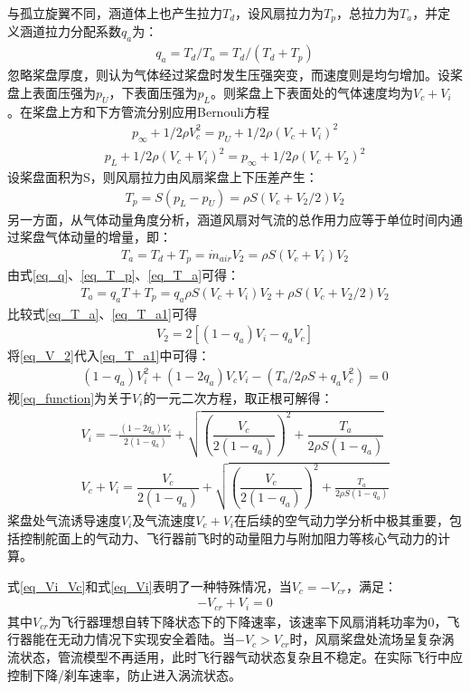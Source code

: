 与孤立旋翼不同，涵道体上也产生拉力$ T_d $，设风扇拉力为$ T_p $，总拉力为$ T_a $，并定义涵道拉力分配系数$ q_a $为：
\begin{align}
q_a=T_d/T_a=T_d/(T_d+T_p )
\end{align}
忽略桨盘厚度，则认为气体经过桨盘时发生压强突变，而速度则是均匀增加。设桨盘上表面压强为$ p_U $，下表面压强为$ p_L $。则桨盘上下表面处的气体速度均为$ V_c+V_i $。在桨盘上方和下方管流分别应用Bernouli方程
\begin{align}
p_\infty+1/2 ρV_c^2=p_U+1/2 ρ(V_c+V_i )^2	\label{eq_q}
\end{align}
\begin{align}
p_L+1/2 ρ(V_c+V_i )^2=p_\infty+1/2 ρ(V_c+V_2 )^2	
\end{align}
设桨盘面积为S，则风扇拉力由风扇桨盘上下压差产生：
\begin{align}
T_p=S(p_L-p_U )=ρS(V_c+V_2/2) V_2	\label{eq_T_p}
\end{align}
另一方面，从气体动量角度分析，涵道风扇对气流的总作用力应等于单位时间内通过桨盘气体动量的增量，即：
\begin{align}
T_a=T_d+T_p=\dot{m}_{air} V_2=ρS(V_c+V_i ) V_2	\label{eq_T_a}
\end{align}
由式\eqref{eq_q}、\eqref{eq_T_p}、\eqref{eq_T_a}可得：
\begin{align}
T_a=q_aT+T_p= q_aρS(V_c+V_i ) V_2+ ρS(V_c+V_2/2) V_2	\label{eq_T_a1}
\end{align}
比较式\eqref{eq_T_a}、\eqref{eq_T_a1}可得
\begin{align}
V_2=2[(1-q_a) V_i-q_aV_c ]	\label{eq_V_2}
\end{align}
将\eqref{eq_V_2}代入\eqref{eq_T_a1}中可得：
\begin{align}
(1-q_a) V_i^2+(1-2q_a) V_c V_i-(T_a/2ρS+q_aV_c^2 )=0	\label{eq_function}
\end{align}
视\eqref{eq_function}为关于$ V_i $的一元二次方程，取正根可解得：
\begin{align}
V_{i}=-\frac{(1-2 q_a) V_{c}}{2(1-q_a)}+\sqrt{\left(\dfrac{V_{c}}{2(1-q_a)}\right)^{2}+\dfrac{T_a}{2 \rho S(1-q_a)}} \label{eq_Vi}	\\
V_{c}+V_{i}=\dfrac{V_{c}}{2(1-q_a)}+\sqrt{\left(\dfrac{V_{c}}{2(1-q_a)}\right)^{2}+\frac{T_a}{2 \rho S(1-q_a)}}	\label{eq_Vi_Vc}
\end{align}
桨盘处气流诱导速度$ V_i $及气流速度$ V_c+V_i $在后续的空气动力学分析中极其重要，包括控制舵面上的气动力、飞行器前飞时的动量阻力与附加阻力等核心气动力的计算。

式\eqref{eq_Vi_Vc}和式\eqref{eq_Vi}表明了一种特殊情况，当$ V_c=-V_{cr} $，满足：
\begin{align}
-V_{cr}+V_i=0
\end{align}
其中$ V_{cr} $为飞行器理想自转下降状态下的下降速率，该速率下风扇消耗功率为0，飞行器能在无动力情况下实现安全着陆。当$ -V_c>V_{cr} $时，风扇桨盘处流场呈复杂涡流状态，管流模型不再适用，此时飞行器气动状态复杂且不稳定。在实际飞行中应控制下降/刹车速率，防止进入涡流状态。

